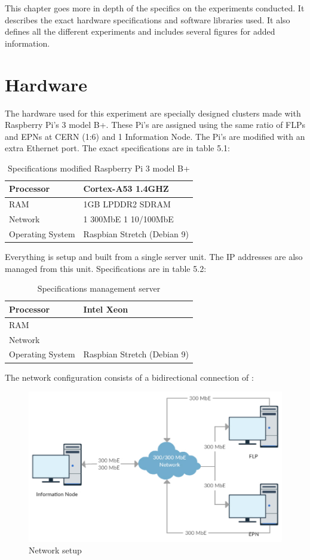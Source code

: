 This chapter goes more in depth of the specifics on the experiments conducted. It describes the exact hardware specifications and software libraries used. It also defines all the different experiments and includes several figures for added information.
\section{Hardware}
The hardware used for this experiment are specially designed clusters made with Raspberry Pi's 3 model B+. These Pi's are assigned using the same ratio of FLPs and EPNs at CERN (1:6) and 1 Information Node. The Pi's are modified with an extra Ethernet port. The exact specifications are in table 5.1:

\begin{table}[htb]
\begin{tabular}{| l | l |}
\hline
Processor & Cortex-A53 1.4GHZ\\ \hline
RAM & 1GB LPDDR2 SDRAM\\ \hline
Network & 1 300MbE 1 10/100MbE \\ \hline
Operating System & Raspbian Stretch (Debian 9)\\ \hline
\end{tabular} 
\caption{Specifications modified Raspberry Pi 3 model B+}
\end{table}

Everything is setup and built from a single server unit. The IP addresses are also managed from this unit. Specifications are in table 5.2:

\begin{table}[htb]
\begin{tabular}{| l | l |}
\hline
Processor & Intel Xeon\\ \hline
RAM & \\ \hline
Network & \\ \hline
Operating System & Raspbian Stretch (Debian 9)\\ \hline
\end{tabular}
\caption{Specifications management server}
\end{table}

\newpage

The network configuration consists of a bidirectional connection of :
\begin{figure}[htb]
    \centering
    \includegraphics[scale=0.5]{./graphics/chapter5/Network_thesis.pdf}
    \caption{Network setup}
\end{figure}

